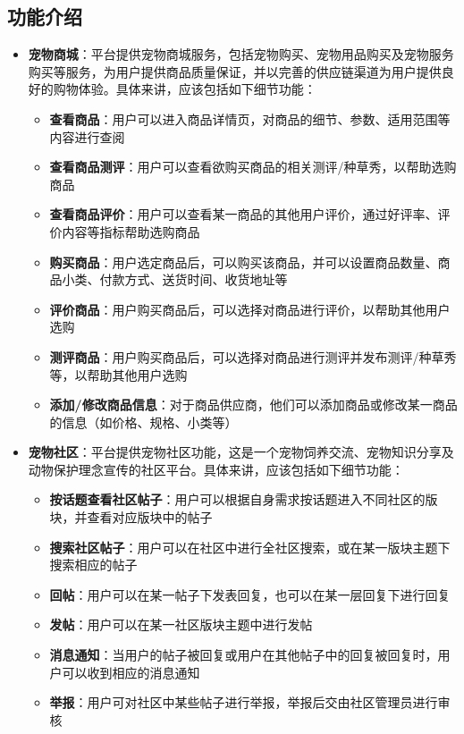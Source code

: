 \documentclass[a4paper]{ctexart}
\begin{document}
\subsection{功能介绍}
\begin{itemize}
  \item \textbf{宠物商城}：平台提供宠物商城服务，包括宠物购买、宠物用品购买及宠物服务购买等服务，为用户提供商品质量保证，并以完善的供应链渠道为用户提供良好的购物体验。具体来讲，应该包括如下细节功能：
  \begin{itemize}
    \item \textbf{查看商品}：用户可以进入商品详情页，对商品的细节、参数、适用范围等内容进行查阅
    \item \textbf{查看商品测评}：用户可以查看欲购买商品的相关测评/种草秀，以帮助选购商品
    \item \textbf{查看商品评价}：用户可以查看某一商品的其他用户评价，通过好评率、评价内容等指标帮助选购商品
    \item \textbf{购买商品}：用户选定商品后，可以购买该商品，并可以设置商品数量、商品小类、付款方式、送货时间、收货地址等
    \item \textbf{评价商品}：用户购买商品后，可以选择对商品进行评价，以帮助其他用户选购
    \item \textbf{测评商品}：用户购买商品后，可以选择对商品进行测评并发布测评/种草秀等，以帮助其他用户选购
    \item \textbf{添加/修改商品信息}：对于商品供应商，他们可以添加商品或修改某一商品的信息（如价格、规格、小类等）
  \end{itemize}
  \item \textbf{宠物社区}：平台提供宠物社区功能，这是一个宠物饲养交流、宠物知识分享及动物保护理念宣传的社区平台。具体来讲，应该包括如下细节功能：
  \begin{itemize}
    \item \textbf{按话题查看社区帖子}：用户可以根据自身需求按话题进入不同社区的版块，并查看对应版块中的帖子
    \item \textbf{搜索社区帖子}：用户可以在社区中进行全社区搜索，或在某一版块主题下搜索相应的帖子
    \item \textbf{回帖}：用户可以在某一帖子下发表回复，也可以在某一层回复下进行回复
    \item \textbf{发帖}：用户可以在某一社区版块主题中进行发帖
    \item \textbf{消息通知}：当用户的帖子被回复或用户在其他帖子中的回复被回复时，用户可以收到相应的消息通知
    \item \textbf{举报}：用户可对社区中某些帖子进行举报，举报后交由社区管理员进行审核

\end{itemize}
\end{itemize}
\end{document}

